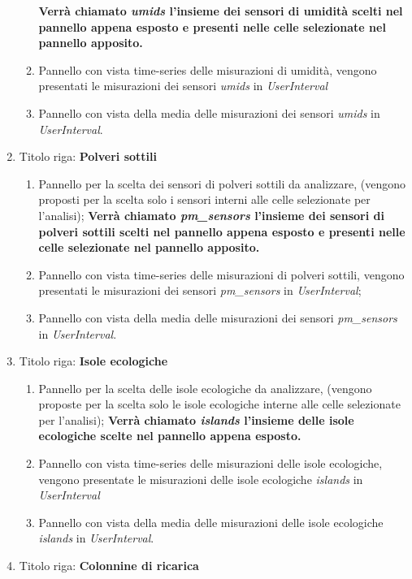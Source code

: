 \begin{enumerate}
\begin{enumerate}
        \textbf{Verrà chiamato \textit{umids} l'insieme dei sensori di umidità scelti nel pannello appena esposto e presenti nelle celle selezionate nel pannello apposito.}
        \item Pannello con vista time-series delle misurazioni di umidità, vengono presentati le misurazioni dei sensori \textit{umids} in \textit{UserInterval}
        \item Pannello con vista della media delle misurazioni dei sensori \textit{umids} in \textit{UserInterval}.
    \end{enumerate}
    \item Titolo riga: \textbf{Polveri sottili}
    \begin{enumerate}
        \item Pannello per la scelta dei sensori di polveri sottili da analizzare, (vengono proposti per la scelta solo i sensori interni alle celle selezionate per l'analisi);
        \textbf{Verrà chiamato \textit{pm\_sensors} l'insieme dei sensori di polveri sottili scelti nel pannello appena esposto e presenti nelle celle selezionate nel pannello apposito.}
        \item Pannello con vista time-series delle misurazioni di polveri sottili, vengono presentati le misurazioni dei sensori \textit{pm\_sensors} in \textit{UserInterval};
        \item Pannello con vista della media delle misurazioni dei sensori \textit{pm\_sensors} in \textit{UserInterval}.
    \end{enumerate}
    \item Titolo riga: \textbf{Isole ecologiche}
    \begin{enumerate}
        \item Pannello per la scelta delle isole ecologiche da analizzare, (vengono proposte per la scelta solo le isole ecologiche interne alle celle selezionate per l'analisi);
        \textbf{Verrà chiamato \textit{islands} l'insieme delle isole ecologiche scelte nel pannello appena esposto.}
        \item Pannello con vista time-series delle misurazioni delle isole ecologiche, vengono presentate le misurazioni delle isole ecologiche \textit{islands} in \textit{UserInterval}
        \item Pannello con vista della media delle misurazioni delle isole ecologiche \textit{islands} in \textit{UserInterval}.
    \end{enumerate}
\item Titolo riga: \textbf{Colonnine di ricarica}

\end{enumerate}
